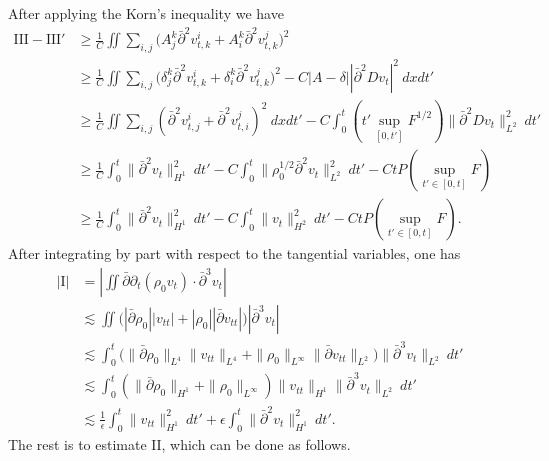 \documentclass[12pt,a4paper]{amsart}
\numberwithin{equation}{section}
\theoremstyle{plain}
\theoremstyle{definition}
\newcommand{\bpartial}{\bar{\partial}}
\begin{document}
After applying the Korn's inequality we have
\begin{align*}
\mathrm{III}-\mathrm{III}'& 
\geq  \frac{1}{C}
\iint\sum\limits_{i,j}\Big(A^k_j  \bpartial^2 v_{t,k}^i+A^k_i  \bpartial^2 v_{t,k}^j\Big)^2 \\
&\geq \frac{1}{C}\iint  \sum\limits_{i,j}
    \Big(\delta^k_j  \bpartial^2 v_{t,k}^i+\delta^k_i \bpartial^2 v_{t,k}^j\Big)^2
    -C|A-\delta| |\bpartial^2 Dv_{t}|^2 \ dxdt'\\
&\geq\frac{1}{C}\iint\sum\limits_{i,j}
    ( \bpartial^2 v_{t,j}^i+ \bpartial^2 v_{t,i}^j)^2 \ dxdt'
    -C \int_{0}^{t}  (t'\sup\limits_{[0,t']}F^{1/2})  \| \bpartial^2 Dv_{t}\|_{L^2}^2\ dt'\\
& \geq \frac{1}{C}\int_{0}^{t} \|\bpartial^2 v_{t}\|_{H^1}^2 \ dt'
    -C\int_{0}^{t}\|\rho_0^{1/2} \bpartial^2 v_{t}\|_{L^2}^2\ dt'-CtP(\sup\limits_{t'\in[0,t]}F)\\
& \geq \frac{1}{C}\int_{0}^{t} \|\bpartial^2 v_{t}\|_{H^1}^2 \ dt'
    -C\int_{0}^{t} \|  v_t\|_{H^2}^2\ dt'-CtP(\sup\limits_{t'\in[0,t]}F).
\end{align*}
After integrating by part with respect to the tangential variables, one has 
\begin{align*}
|\mathrm{I}|&=\left| \iint \bpartial \partial_t(\rho_0 v_t) \cdot \bpartial^3 v_t \right|\\
&\lesssim \iint \Big( |\bpartial \rho_0| |v_{tt}|+|\rho_0| |\bpartial v_{tt}|  \Big)
          |\bpartial^3 v_t|\\
     &\lesssim \int_{0}^{t} \Big( \|\bpartial \rho_0\|_{L^4} \|v_{tt}\|_{L^4}+\|\rho_0\|_{L^{\infty}} \|\bpartial v_{tt}\|_{L^2}  \Big)
           \|\bpartial^3 v_t\|_{L^2} \ dt'\\
     &\lesssim \int_{0}^{t} ( \|\bpartial \rho_0\|_{H^1}+ \|\rho_0\|_{L^{\infty}})\|v_{tt}\|_{H^1} 
                \|\bpartial^3 v_t\|_{L^2} \ dt'\\
     &\lesssim  \frac{1}{\epsilon}\int_{0}^{t}  \|v_{tt}\|_{H^1}^2 \ dt'
           +  \epsilon \int_{0}^{t}  \|\bpartial^2 v_t\|_{H^1} ^2\ dt'. 
\end{align*}
The rest is to estimate $\mathrm{II}$, which can be done as follows.
\end{document}
